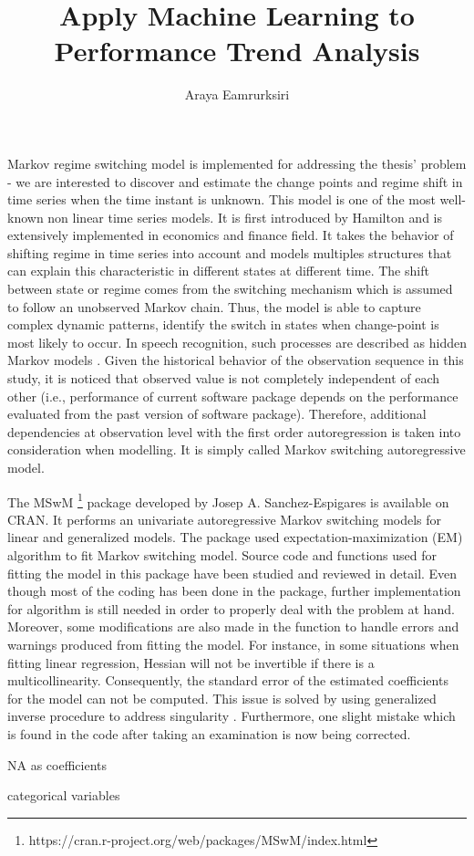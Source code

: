 \documentclass[]{article}
\title{Apply Machine Learning to Performance Trend Analysis}
\author{Araya Eamrurksiri}
\begin{document}
\date{}
\maketitle

Markov regime switching model is implemented for addressing the thesis' problem - we are interested to discover and estimate the change points and regime shift in time series when the time instant is unknown. This model is one of the most well-known non linear time series models. It is first introduced by Hamilton \cite{hamilton1989new} and is extensively implemented in economics and finance field. It takes the behavior of shifting regime in time series into account and models multiples structures that can explain this characteristic in different states at different time. The shift between state or regime comes from the switching mechanism which is assumed to follow an unobserved Markov chain. Thus, the model is able to capture complex dynamic patterns, identify the switch in states when change-point is most likely to occur. In speech recognition, such processes are described as hidden Markov models \cite{rabiner1989tutorial}. Given the historical behavior of the observation sequence in this study, it is noticed that observed value is not completely independent of each other (i.e., performance of current software package depends on the performance evaluated from the past version of software package). Therefore, additional dependencies at observation level with the first order autoregression is taken into consideration when modelling. It is simply called Markov switching autoregressive model.

The MSwM \footnote{https://cran.r-project.org/web/packages/MSwM/index.html} package developed by Josep A. Sanchez-Espigares is available on CRAN. It performs an univariate autoregressive Markov switching models for linear and generalized models. The package used expectation-maximization (EM) algorithm to fit Markov switching model. Source code and functions used for fitting the model in this package have been studied and reviewed in detail. Even though most of the coding has been done in the package, further implementation for algorithm is still needed in order to properly deal with the problem at hand. Moreover, some modifications are also made in the function to handle errors and warnings produced from fitting the model. For instance, in some situations when fitting linear regression, Hessian will not be invertible if there is a multicollinearity. Consequently, the standard error of the estimated coefficients for the model can not be computed. This issue is solved by using generalized inverse procedure to address singularity \cite{gill2004your}. Furthermore, one slight mistake which is found in the code after taking an examination is now being corrected.


NA as coefficients

categorical variables 
 



\end{document}
